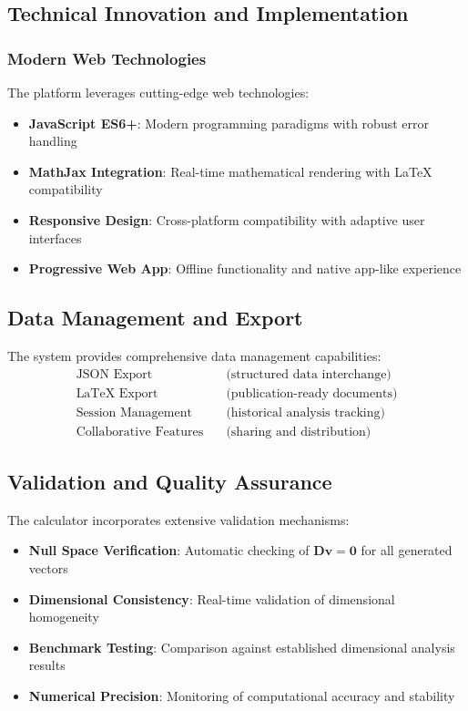 \subsection{Technical Innovation and Implementation}
\subsubsection*{Modern Web Technologies}
The platform leverages cutting-edge web technologies:
\begin{itemize}
    \item \textbf{JavaScript ES6+}: Modern programming paradigms with robust error handling
    \item \textbf{MathJax Integration}: Real-time mathematical rendering with LaTeX compatibility
    \item \textbf{Responsive Design}: Cross-platform compatibility with adaptive user interfaces
    \item \textbf{Progressive Web App}: Offline functionality and native app-like experience
\end{itemize}

\subsection{Data Management and Export}
The system provides comprehensive data management capabilities:
\begin{align}
\text{JSON Export} &\quad \text{(structured data interchange)} \\
\text{LaTeX Export} &\quad \text{(publication-ready documents)} \\
\text{Session Management} &\quad \text{(historical analysis tracking)} \\
\text{Collaborative Features} &\quad \text{(sharing and distribution)}
\end{align}

\subsection{Validation and Quality Assurance}
The calculator incorporates extensive validation mechanisms:
\begin{itemize}
    \item \textbf{Null Space Verification}: Automatic checking of $\mathbf{D}\mathbf{v} = \mathbf{0}$ for all generated vectors
    \item \textbf{Dimensional Consistency}: Real-time validation of dimensional homogeneity
    \item \textbf{Benchmark Testing}: Comparison against established dimensional analysis results
    \item \textbf{Numerical Precision}: Monitoring of computational accuracy and stability
\end{itemize}

